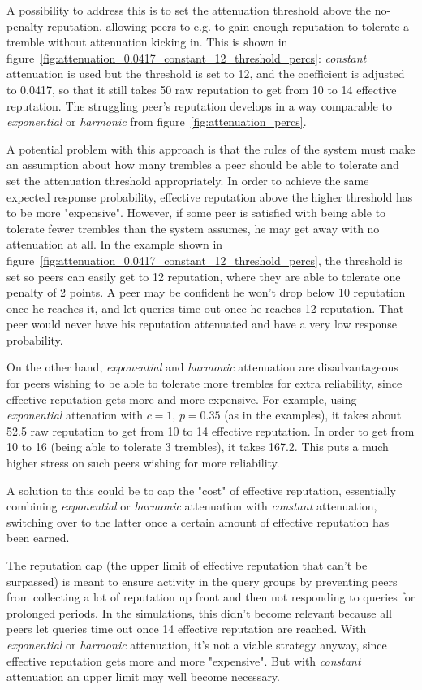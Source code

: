 A possibility to address this is to set the attenuation threshold above the
no-penalty reputation, allowing peers to e.g. to gain enough reputation to
tolerate a tremble without attenuation kicking in. This is shown in
figure~\ref{fig:attenuation_0.0417_constant_12_threshold_percs}: \emph{constant}
attenuation is used but the threshold is set to 12, and the coefficient is
adjusted to 0.0417, so that it still takes 50 raw reputation to get from 10 to
14 effective reputation. The struggling peer's reputation develops in a way
comparable to \emph{exponential} or \emph{harmonic} from
figure~\ref{fig:attenuation_percs}.

A potential problem with this approach is that the rules of the system must make
an assumption about how many trembles a peer should be able to tolerate and set
the attenuation threshold appropriately. In order to achieve the same expected
response probability, effective reputation above the higher threshold has to be
more "expensive". However, if some peer is satisfied with being able to tolerate
fewer trembles than the system assumes, he may get away with no attenuation at
all. In the example shown in
figure~\ref{fig:attenuation_0.0417_constant_12_threshold_percs}, the threshold
is set so peers can easily get to 12 reputation, where they are able to tolerate
one penalty of 2 points. A peer may be confident he won't drop below 10
reputation once he reaches it, and let queries time out once he reaches 12
reputation. That peer would never have his reputation attenuated and have a very
low response probability.

On the other hand, \emph{exponential} and \emph{harmonic} attenuation are
disadvantageous for peers wishing to be able to tolerate more trembles for extra
reliability, since effective reputation gets more and more expensive. For
example, using \emph{exponential} attenation with $c = 1$, $p = 0.35$ (as in the
examples), it takes about 52.5 raw reputation to get from 10 to 14 effective
reputation. In order to get from 10 to 16 (being able to tolerate 3 trembles),
it takes 167.2. This puts a much higher stress on such peers wishing for more
reliability.

A solution to this could be to cap the "cost" of effective reputation,
essentially combining \emph{exponential} or \emph{harmonic} attenuation with
\emph{constant} attenuation, switching over to the latter once a certain amount
of effective reputation has been earned.

The reputation cap (the upper limit of effective reputation that can't be
surpassed) is meant to ensure activity in the query groups by preventing peers
from collecting a lot of reputation up front and then not responding to queries
for prolonged periods. In the simulations, this didn't become relevant because
all peers let queries time out once 14 effective reputation are reached. With
\emph{exponential} or \emph{harmonic} attenuation, it's not a viable strategy
anyway, since effective reputation gets more and more "expensive". But with
\emph{constant} attenuation an upper limit may well become necessary.


